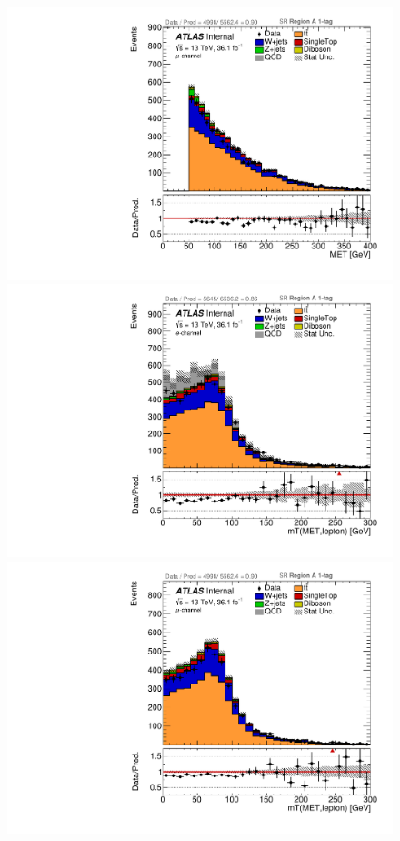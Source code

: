 \begin{figure}[!htbp]
\begin{center}
\includegraphics[scale=0.33]{./figures/boosted/ABCD_1tag0bjet/muon_SR_RegionA_MET_withDD}  \\
\includegraphics[scale=0.33]{./figures/boosted/ABCD_1tag0bjet/elec_SR_RegionA_WlepMtATLAS_withDD}
\includegraphics[scale=0.33]{./figures/boosted/ABCD_1tag0bjet/muon_SR_RegionA_WlepMtATLAS_withDD}\\

\end{center}
\end{figure}
